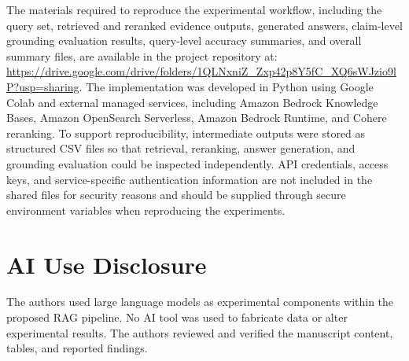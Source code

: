 The materials required to reproduce the experimental workflow, including the query set, retrieved and reranked evidence outputs, generated answers, claim-level grounding evaluation results, query-level accuracy summaries, and overall summary files, are available in the project repository at: \url{https://drive.google.com/drive/folders/1QLNxniZ_Zxp42p8Y5fC_XQ6sWJzio9lP?usp=sharing}. The implementation was developed in Python using Google Colab and external managed services, including Amazon Bedrock Knowledge Bases, Amazon OpenSearch Serverless, Amazon Bedrock Runtime, and Cohere reranking. To support reproducibility, intermediate outputs were stored as structured CSV files so that retrieval, reranking, answer generation, and grounding evaluation could be inspected independently. API credentials, access keys, and service-specific authentication information are not included in the shared files for security reasons and should be supplied through secure environment variables when reproducing the experiments.

\section*{AI Use Disclosure}
The authors used large language models as experimental components within the proposed RAG pipeline. No AI tool was used to fabricate data or alter experimental results. The authors reviewed and verified the manuscript content, tables, and reported findings.